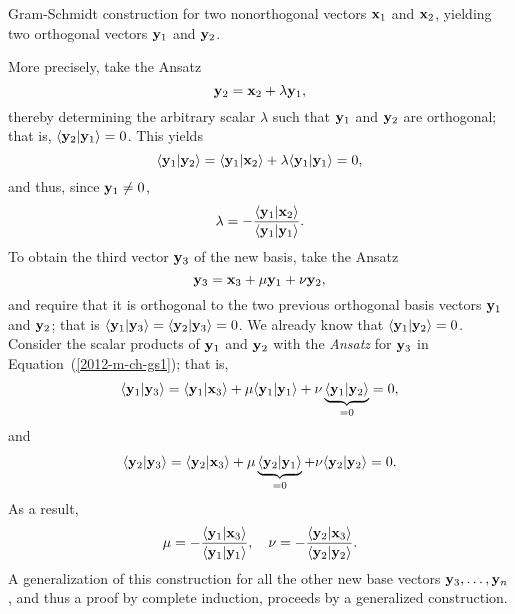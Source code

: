 {\begin{marginfigure}
{\begin{center}
\begin{tikzpicture}[ scale=0.6]
\end{tikzpicture}
\end{center}%
\caption{\label{2012-m-fdvs-ideaofGS}Gram-Schmidt construction for two nonorthogonal vectors ${\bf x}_1$ and ${\bf x}_2$,
yielding two  orthogonal vectors ${\bf y}_1$ and ${\bf y}_2$.}
}
\end{marginfigure}
More precisely, take the Ansatz
\begin{equation}
{\bf y}_2={\bf x}_2 + \lambda  {\bf y}_1,
\end{equation}
thereby determining the arbitrary scalar $\lambda$ such that
${\bf y}_1$
and
${\bf y}_2$
are orthogonal; that is,
$\langle{\bf y}_2 \vert  {\bf y}_1\rangle =0$.
This yields
\begin{equation}
\langle {\bf y}_1\vert  {\bf y}_2 \rangle
=\langle {\bf y}_1 \vert {\bf x}_2 \rangle
+ \lambda
\langle {\bf y}_1\vert  {\bf y}_1\rangle =0,
\end{equation}
and thus, since ${\bf y}_1 \neq 0$,
\begin{equation}
\lambda =
-
\frac{\langle {\bf y}_1 \vert {\bf x}_2 \rangle}
{\langle {\bf y}_1\vert {\bf y}_1 \rangle} .
\end{equation}
To obtain the third vector ${\bf y}_3$ of the new basis,
take the Ansatz
\begin{equation}
{\bf y}_3={\bf x}_3 + \mu  {\bf y}_1  + \nu  {\bf y}_2,
\label{2012-m-ch-gs1}
\end{equation}
and require that it is orthogonal to the two previous orthogonal basis vectors
${\bf y}_1$
and
${\bf y}_2$;
that is
$\langle {\bf y}_1\vert {\bf y}_3 \rangle =\langle  {\bf y}_2\vert{\bf y}_3  \rangle =0$.
We already know that $\langle {\bf y}_1\vert {\bf y}_2 \rangle = 0$.
Consider the scalar products of ${\bf y}_1$
and ${\bf y}_2$
with the {\it Ansatz} for ${\bf y}_3$ in Equation~(\ref{2012-m-ch-gs1}); that is,
\begin{equation}
\begin{split}
\langle {\bf y}_1\vert {\bf y}_3\rangle
=
\langle {\bf y}_1 \vert {\bf x}_3 \rangle + \mu  \langle {\bf y}_1\vert {\bf y}_1 \rangle  + \nu   \underbrace{\langle {\bf y}_1\vert {\bf y}_2\rangle}_{=0}
 =0,
\end{split}
\end{equation}
and
\begin{equation}
\begin{split}
\langle{\bf y}_2 \vert {\bf y}_3\rangle =\langle {\bf y}_2\vert  {\bf x}_3\rangle + \mu \underbrace{ \langle {\bf y}_2\vert {\bf y}_1 \rangle}_{=0}   + \nu \langle {\bf y}_2\vert {\bf y}_2\rangle
  =0.
\end{split}
\end{equation}
As a result,
\begin{equation}
\mu = -  \frac{\langle {\bf y}_1 \vert {\bf x}_3 \rangle}
{\langle {\bf y}_1\vert {\bf y}_1 \rangle},\quad
\nu =- \frac{\langle {\bf y}_2\vert  {\bf x}_3\rangle}
{\langle {\bf y}_2 \vert {\bf y}_2 \rangle}.
\end{equation}
A generalization of this construction
for all the other new base vectors
${\bf y}_3, \ldots ,  {\bf y}_n$, and thus a proof by complete induction,
proceeds by a generalized construction.
\eproof
}

